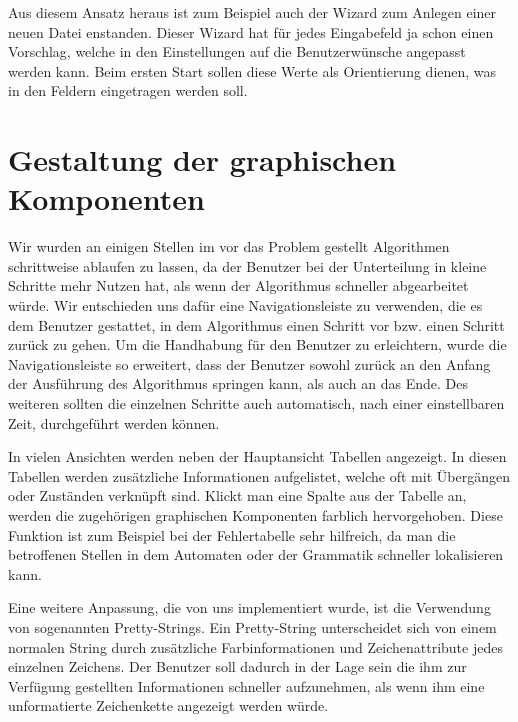 Aus diesem Ansatz heraus ist zum Beispiel auch der Wizard zum Anlegen einer
neuen Datei enstanden. Dieser Wizard hat für jedes Eingabefeld ja schon einen
Vorschlag, welche in den Einstellungen auf die Benutzerwünsche angepasst werden
kann. Beim ersten Start sollen diese Werte als Orientierung dienen, was in den
Feldern eingetragen werden soll.
\vspace{10pt}


\section{Gestaltung der graphischen Komponenten}\label{GUIDesign}

Wir wurden an einigen Stellen im \gtitool vor das Problem gestellt Algorithmen
schrittweise ablaufen zu lassen, da der Benutzer bei der Unterteilung in kleine
Schritte mehr Nutzen hat, als wenn der Algorithmus schneller abgearbeitet würde.
Wir entschieden uns dafür eine Navigationsleiste zu verwenden, die es dem
Benutzer gestattet, in dem Algorithmus einen Schritt vor bzw. einen Schritt
zurück zu gehen. Um die Handhabung für den Benutzer zu erleichtern, wurde die
Navigationsleiste so erweitert, dass der Benutzer sowohl zurück an den Anfang der
Ausführung des Algorithmus springen kann, als auch an das Ende. Des weiteren
sollten die einzelnen Schritte auch automatisch, nach einer einstellbaren Zeit,
durchgeführt werden können.\vspace{10pt}

In vielen Ansichten werden neben der Hauptansicht Tabellen angezeigt. In
diesen Tabellen werden zusätzliche Informationen aufgelistet,
welche oft mit Übergängen oder Zuständen verknüpft sind. Klickt man
eine Spalte aus der Tabelle an, werden die zugehörigen graphischen
Komponenten farblich hervorgehoben. Diese Funktion ist zum Beispiel
bei der Fehlertabelle sehr hilfreich, da man die betroffenen
Stellen in dem Automaten oder der Grammatik schneller lokalisieren
kann.\vspace{10pt}

Eine weitere Anpassung, die von uns implementiert wurde, ist die  Verwendung von
sogenannten Pretty-Strings. Ein Pretty-String unterscheidet sich von einem
normalen String durch zu\-sätz\-liche Farbinformationen und Zeichenattribute
jedes einzelnen Zeichens. Der Benutzer soll dadurch in der Lage sein die ihm zur
Verfügung gestellten Informationen schneller aufzunehmen, als wenn ihm eine
unformatierte Zeichenkette angezeigt werden würde.\vspace{10pt}


